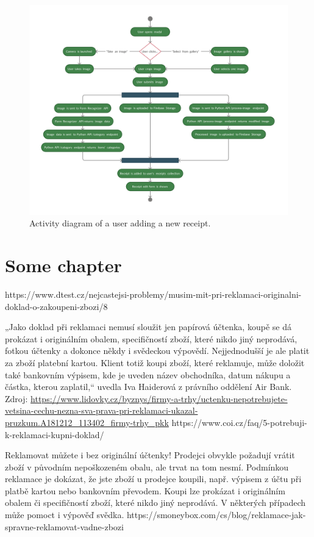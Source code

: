 \documentclass[
  digital, %
  table,   %
  oneside, %
  lof,     %
  lot,     %
]{fithesis3}
\begin{document}
\begin{figure}
    \begin{center}
        \includegraphics[width=\textwidth]{figures/diagrams/Add_receipt_Android}
    \end{center}
    \caption{Activity diagram of a user adding a new receipt.}
    \label{fig:add_receipt_android}
\end{figure}



\chapter{Some chapter}
https://www.dtest.cz/nejcastejsi-problemy/musim-mit-pri-reklamaci-originalni-doklad-o-zakoupeni-zbozi/8


„Jako doklad při reklamaci nemusí sloužit jen papírová účtenka, koupě se dá prokázat i originálním obalem, specifičností zboží, které nikdo jiný neprodává, fotkou účtenky a dokonce někdy i svědeckou výpovědí. Nejjednodušší je ale platit za zboží platební kartou. Klient totiž koupi zboží, které reklamuje, může doložit také bankovním výpisem, kde je uveden název obchodníka, datum nákupu a částka, kterou zaplatil,“ uvedla Iva Haiderová z právního oddělení Air Bank.
Zdroj: \url{https://www.lidovky.cz/byznys/firmy-a-trhy/uctenku-nepotrebujete-vetsina-cechu-nezna-sva-prava-pri-reklamaci-ukazal-pruzkum.A181212_113402_firmy-trhy_pkk}
https://www.coi.cz/faq/5-potrebuji-k-reklamaci-kupni-doklad/

Reklamovat můžete i bez originální účtenky! Prodejci obvykle požadují vrátit zboží v původním nepoškozeném obalu, ale trvat na tom nesmí. Podmínkou reklamace je dokázat, že jste zboží u prodejce koupili, např. výpisem z účtu při platbě kartou nebo bankovním převodem. Koupi lze prokázat i originálním obalem či specifičností zboží, které nikdo jiný neprodává. V některých případech může pomoct i výpověď svědka.
https://smoneybox.com/cs/blog/reklamace-jak-spravne-reklamovat-vadne-zbozi
\end{document}
